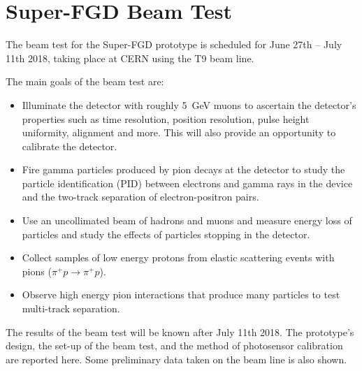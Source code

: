 \documentclass[aps,pra,12pt,notitlepage,tightenlines]{revtex4-1}
\begin{document}
\section{Super-FGD Beam Test}
\label{sec:sfgd}
The beam test for the Super-FGD prototype is scheduled for June 27th -- July 11th 2018, taking place at CERN using the T9 beam line.

The main goals of the beam test are:
\begin{itemize}
 \item Illuminate the detector with roughly 5~GeV muons to ascertain the detector's properties such as time resolution, position resolution, pulse height uniformity, alignment and more. This will also provide an opportunity to calibrate the detector.
 \item Fire gamma particles produced by pion decays at the detector to study the particle identification (PID) between electrons and gamma rays in the device and the two-track separation of electron-positron pairs.
 \item Use an uncollimated beam of hadrons and muons and measure energy loss of particles and study the effects of particles stopping in the detector.
 \item Collect samples of low energy protons from elastic scattering events with pions ($\pi^+ p \rightarrow \pi^+ p$).
 \item Observe high energy pion interactions that produce many particles to test multi-track separation.
\end{itemize}

The results of the beam test will be known after July 11th 2018. The prototype's design, the set-up of the beam test, and the method of photosensor calibration are reported here. Some preliminary data taken on the beam line is also shown.
\end{document}
